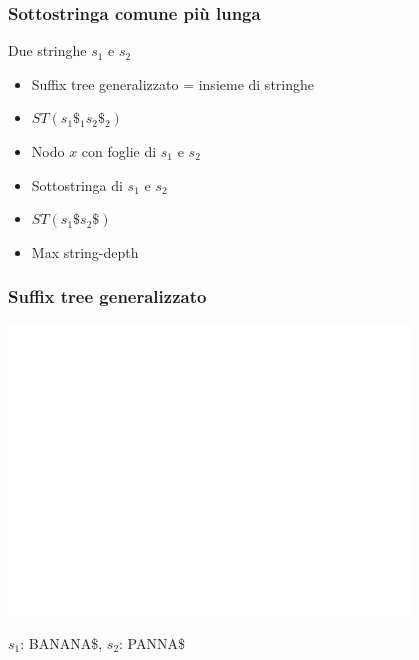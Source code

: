 % 


\begin{frame}[fragile]
\frametitle{Sottostringa comune più lunga}
\begin{block}{Due stringhe $s_{1}$ e $s_{2}$}
\begin{itemize}[<+->]
\item
Suffix tree generalizzato = insieme di stringhe
\item
$ST(s_{1}\$_{1}s_{2}\$_{2})$
\item
Nodo $x$ con foglie di $s_{1}$ e $s_{2}$
\item
Sottostringa di $s_{1}$ e $s_{2}$
\item
$ST(s_{1}\$s_{2}\$)$
\item
Max string-depth
\end{itemize}
\end{block}
\end{frame}



\begin{frame}
\frametitle{Suffix tree generalizzato}
\begin{center}
\includegraphics[width=0.8\textwidth]{ST-banana-panna}
\end{center}
$s_{1}$: BANANA\$, $s_{2}$: PANNA\$
\end{frame}


